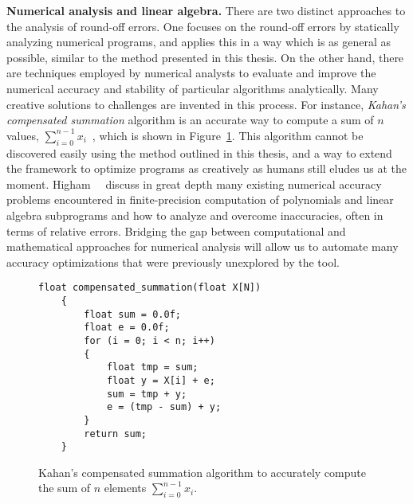\textbf{Numerical analysis and linear algebra.}  There are two distinct
approaches to the analysis of round-off errors.  One focuses on the round-off
errors by statically analyzing numerical programs, and applies this in a way
which is as general as possible, similar to the method presented in this
thesis.  On the other hand, there are techniques employed by numerical analysts
to evaluate and improve the numerical accuracy and stability of particular
algorithms analytically.  Many creative solutions to challenges are invented
in this process.  For instance, \emph{Kahan's compensated summation} algorithm
is an accurate way to compute a sum of $n$ values, $\sum_{i = 0}^{n-1}
x_i$~\cite{kahan65}, which is shown in Figure~\ref{co:lst:sum}.  This algorithm
cannot be discovered easily using the method outlined in this thesis, and a
way to extend the framework to optimize programs as creatively as humans still
eludes us at the moment.  Higham~\etal~\cite{higham02} discuss in great depth
many existing numerical accuracy problems encountered in finite-precision
computation of polynomials and linear algebra subprograms and how to analyze
and overcome inaccuracies, often in terms of relative errors.  Bridging the
gap between computational and mathematical approaches for numerical analysis
will allow us to automate many accuracy optimizations that were previously
unexplored by the tool.
\begin{figure}[ht]
    \centering
\begin{lstlisting}[]
    float compensated_summation(float X[N])
    {
        float sum = 0.0f;
        float e = 0.0f;
        for (i = 0; i < n; i++)
        {
            float tmp = sum;
            float y = X[i] + e;
            sum = tmp + y;
            e = (tmp - sum) + y;
        }
        return sum;
    }
\end{lstlisting}
    \caption{%
        Kahan's compensated summation algorithm to accurately compute the sum
        of $n$ elements $\sum_{i = 0}^{n-1} x_i$.
    }\label{co:lst:sum}
\end{figure}

